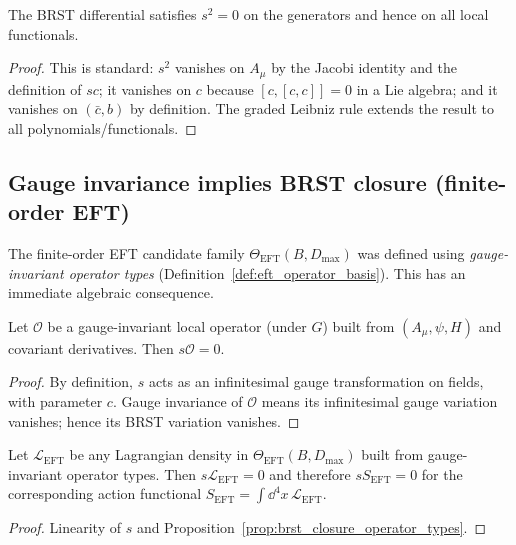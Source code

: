 \begin{lemma}[Nilpotency]\label{lem:brst_nilpotent}
\MathTag The BRST differential satisfies $s^2=0$ on the generators and hence on all local functionals.
\end{lemma}
\begin{proof}
This is standard: $s^2$ vanishes on $A_\mu$ by the Jacobi identity and the definition of $sc$; it vanishes on $c$ because $[c,[c,c]]=0$ in a Lie algebra; and it vanishes on $(\bar c,b)$ by definition.
The graded Leibniz rule extends the result to all polynomials/functionals.
\end{proof}

\subsection{Gauge invariance implies BRST closure (finite-order EFT)}

The finite-order EFT candidate family $\Theta_{\mathrm{EFT}}(B,D_{\max})$ was defined using \emph{gauge-invariant operator types} (Definition~\ref{def:eft_operator_basis}).
This has an immediate algebraic consequence.

\begin{proposition}\label{prop:brst_closure_operator_types}
\MathTag Let $\mathcal{O}$ be a gauge-invariant local operator (under $G$) built from $(A_\mu,\psi,H)$ and covariant derivatives.
Then $s\mathcal{O}=0$.
\end{proposition}
\begin{proof}
By definition, $s$ acts as an infinitesimal gauge transformation on fields, with parameter $c$.
Gauge invariance of $\mathcal{O}$ means its infinitesimal gauge variation vanishes; hence its BRST variation vanishes.
\end{proof}

\begin{corollary}\label{cor:brst_closure_eft_representative}
\MathTag Let $\mathcal{L}_{\mathrm{EFT}}$ be any Lagrangian density in $\Theta_{\mathrm{EFT}}(B,D_{\max})$ built from gauge-invariant operator types.
Then $s\mathcal{L}_{\mathrm{EFT}}=0$ and therefore $sS_{\mathrm{EFT}}=0$ for the corresponding action functional $S_{\mathrm{EFT}}=\int\dd^4x\,\mathcal{L}_{\mathrm{EFT}}$.
\end{corollary}
\begin{proof}
Linearity of $s$ and Proposition~\ref{prop:brst_closure_operator_types}.
\end{proof}

